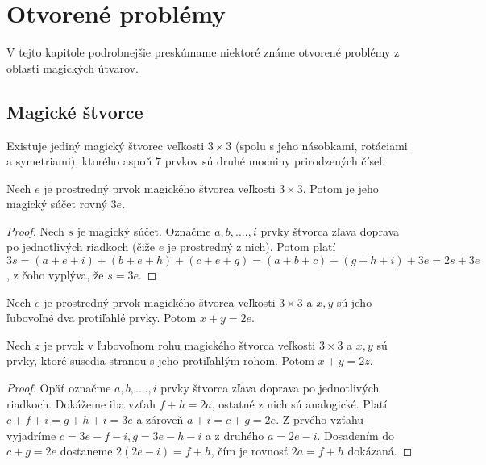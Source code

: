 \chapter{Otvorené problémy}

\label{kap:definitions} %

\label{kap: openproblems} %

V tejto kapitole podrobnejšie preskúmame niektoré známe otvorené problémy z oblasti magických útvarov.

\section{Magické štvorce}

\begin{hypothesis} Existuje jediný magický štvorec veľkosti $3 \times 3$ (spolu s jeho násobkami, rotáciami a symetriami), ktorého aspoň $7$ prvkov sú druhé mocniny prirodzených čísel.
\end{hypothesis}

\begin{theorem} Nech $e$ je prostredný prvok magického štvorca veľkosti $3 \times 3$. Potom je jeho magický súčet rovný $3e$.
\end{theorem}

\begin{proof} Nech $s$ je magický súčet. Označme $a, b, .... , i$ prvky štvorca zľava doprava po jednotlivých riadkoch (čiže $e$ je prostredný z nich). Potom platí $3s = (a + e + i) + (b + e + h) + (c + e + g) = (a + b + c) + (g + h + i) + 3e = 2s + 3e$, z čoho vyplýva, že $s = 3e$.
\end{proof}

\begin{consequence} Nech $e$ je prostredný prvok magického štvorca veľkosti $3 \times 3$ a $x,y$ sú jeho ľubovoľné dva protiľahlé prvky. Potom $x + y = 2e$.
\end{consequence}

\begin{consequence}
\label{square3x3afh}
Nech $z$ je prvok v ľubovoľnom rohu magického štvorca veľkosti $3 \times 3$ a $x,y$ sú prvky, ktoré susedia stranou s jeho protiľahlým rohom. Potom $x + y = 2z$.
\end{consequence}

\begin{proof} Opäť označme $a, b, .... , i$ prvky štvorca zľava doprava po jednotlivých riadkoch. Dokážeme iba vzťah $f + h = 2a$, ostatné z nich sú analogické. Platí $c + f + i = g + h + i = 3e$ a zároveň $a + i = c + g = 2e$. Z prvého vzťahu vyjadríme $c = 3e - f - i, g = 3e - h - i$ a z druhého $a = 2e - i$. Dosadením do $c + g = 2e$ dostaneme $2(2e - i) = f + h$, čím je rovnosť $2a = f + h$ dokázaná.
\end{proof}

